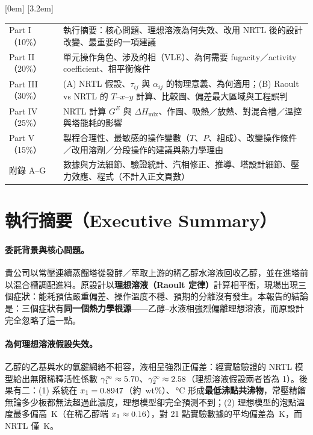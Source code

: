 \documentclass[UTF8,a4paper,11pt,fontset=none,zihao=-4]{ctexart}
\numberwithin{equation}{section}\renewcommand{\theequation}{\arabic{section}.\arabic{equation}}
\numberwithin{figure}{section}\renewcommand{\thefigure}{\arabic{section}.\arabic{figure}}
\numberwithin{table}{section}\renewcommand{\thetable}{\arabic{section}.\arabic{table}}
\begin{document}
\begingroup
{}[0em]{\addvspace{3pt}\bfseries}{\thecontentslabel\quad}{}{\hfill\contentspage}
[3.2em]{}{\contentslabel{2.2em}}{}{\contentspage}
\small
\tableofcontents
\endgroup
\vspace{1.2em}
\begin{notebox}[報告結構與評分項目對照]
\small
\begin{tabularx}{\linewidth}{@{}lX@{}}
Part I（10\%） & 執行摘要：核心問題、理想溶液為何失效、改用 NRTL 後的設計改變、最重要的一項建議 \\
Part II（20\%） & 單元操作角色、涉及的相（VLE）、為何需要 fugacity／activity coefficient、相平衡條件 \\
Part III（30\%） & (A) NRTL 假設、$\tau_{ij}$ 與 $\alpha_{ij}$ 的物理意義、為何適用；(B) Raoult vs NRTL 的 $T$--$x$--$y$ 計算、比較圖、偏差最大區域與工程誤判 \\
Part IV（25\%） & NRTL 計算 $G^{E}$ 與 $\Delta H_{\mathrm{mix}}$、作圖、吸熱／放熱、對混合槽／溫控與塔能耗的影響 \\
Part V（15\%） & 製程合理性、最敏感的操作變數（$T$、$P$、組成）、改變操作條件／改用溶劑／分段操作的建議與熱力學理由 \\
附錄 A--G & 數據與方法細節、驗證統計、汽相修正、推導、塔設計細節、壓力效應、程式（不計入正文頁數）
\end{tabularx}
\end{notebox}
\clearpage
{}

\section{執行摘要（Executive Summary）}\label{sec:exec}

\paragraph{委託背景與核心問題。}貴公司以常壓連續蒸餾塔從發酵／萃取上游的稀乙醇水溶液回收乙醇，並在進塔前以混合槽調配進料。原設計以\textbf{理想溶液（Raoult 定律）}計算相平衡，現場出現三個症狀：能耗預估嚴重偏差、操作溫度不穩、預期的分離沒有發生。本報告的結論是：三個症狀有\textbf{同一個熱力學根源}——乙醇--水液相強烈偏離理想溶液，而原設計完全忽略了這一點。

\paragraph{為何理想溶液假設失效。}乙醇的乙基與水的氫鍵網絡不相容，液相呈強烈正偏差：經實驗驗證的 NRTL 模型給出無限稀釋活性係數 $\gamma_1^\infty\approx5.70$、$\gamma_2^\infty\approx2.58$（理想溶液假設兩者皆為 1）。後果有二：(1) 系統在 $x_1=0.8947$（約 \nwAz\,wt\%）、\nTAz\,°C 形成\textbf{最低沸點共沸物}，常壓精餾無論多少板都無法超過此濃度，理想模型卻完全預測不到；(2) 理想模型的泡點溫度最多偏高 \ndTmax\,K（在稀乙醇端 $x_1\approx0.16$），對 21 點實驗數據的平均偏差為 \naadTAAD\,K，而 NRTL 僅 \naadTNL\,K。
\end{document}

